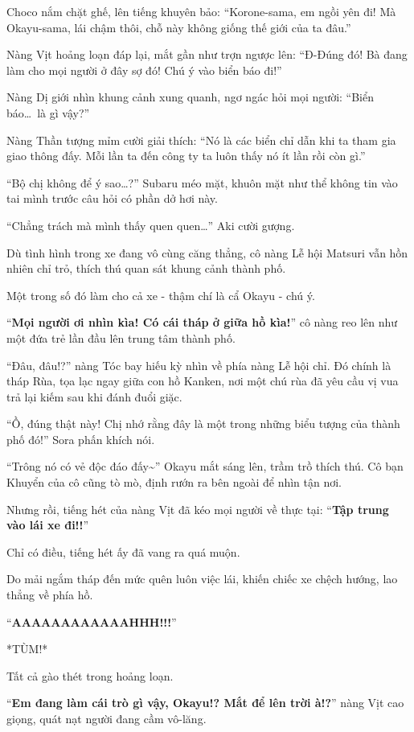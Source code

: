 \documentclass[../main.tex]{subfiles}
\begin{document}
Choco nắm chặt ghế, lên tiếng khuyên bảo: ``Korone-sama, em ngồi yên đi! Mà Okayu-sama, lái chậm thôi, chỗ này không giống thế giới của ta đâu.''

Nàng Vịt hoảng loạn đáp lại, mắt gần như trợn ngược lên: ``Đ-Đúng đó! Bà đang làm cho mọi người ở đây sợ đó! Chú ý vào biển báo đi!''

Nàng Dị giới nhìn khung cảnh xung quanh, ngơ ngác hỏi mọi người: ``Biển báo\dots\ là gì vậy?''

Nàng Thần tượng mỉm cười giải thích: ``Nó là các biển chỉ dẫn khi ta tham gia giao thông đấy. Mỗi lần ta đến công ty ta luôn thấy nó ít lần rồi còn gì.''

``Bộ chị không để ý sao\dots?'' Subaru méo mặt, khuôn mặt như thể không tin vào tai mình trước câu hỏi có phần dở hơi này.

``Chẳng trách mà mình thấy quen quen\dots'' Aki cười gượng.

Dù tình hình trong xe đang vô cùng căng thẳng, cô nàng Lễ hội Matsuri vẫn hồn nhiên chỉ trỏ, thích thú quan sát khung cảnh thành phố.

Một trong số đó làm cho cả xe - thậm chí là cẩ Okayu - chú ý.

``\textbf{Mọi người ơi nhìn kìa! Có cái tháp ở giữa hồ kìa!}'' cô nàng reo lên như một đứa trẻ lần đầu lên trung tâm thành phố.

``Đâu, đâu!?'' nàng Tóc bay hiếu kỳ nhìn về phía nàng Lễ hội chỉ. Đó chính là tháp Rùa, tọa lạc ngay giữa con hồ Kanken, nơi một chú rùa đã yêu cầu vị vua trả lại kiếm sau khi đánh đuổi giặc.

``Ồ, đúng thật này! Chị nhớ rằng đây là một trong những biểu tượng của thành phố đó!'' Sora phấn khích nói.

``Trông nó có vẻ độc đáo đấy\~{}'' Okayu mắt sáng lên, trầm trồ thích thú. Cô bạn Khuyển của cô cũng tò mò, định rướn ra bên ngoài để nhìn tận nơi.

Nhưng rồi, tiếng hét của nàng Vịt đã kéo mọi người về thực tại: ``\textbf{Tập trung vào lái xe đi!!}''

Chỉ có điều, tiếng hét ấy đã vang ra quá muộn.

Do mải ngắm tháp đến mức quên luôn việc lái, khiến chiếc xe chệch hướng, lao thẳng về phía hồ.

``\textbf{AAAAAAAAAAAAHHH!!!}''

*TÙM!*

Tất cả gào thét trong hoảng loạn.

``\textbf{Em đang làm cái trò gì vậy, Okayu!? Mắt để lên trời à!?}'' nàng Vịt cao giọng, quát nạt người đang cầm vô-lăng.
\end{document}
